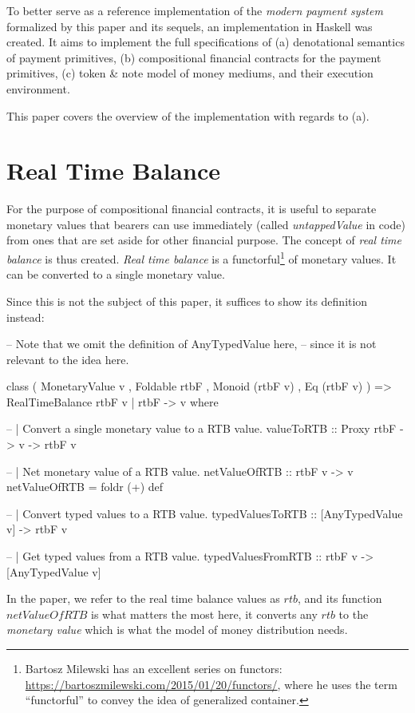 To better serve as a reference implementation of the \textit{modern payment system} formalized by
this paper and its sequels, an implementation in Haskell was created. It aims to implement the full
specifications of (a) denotational semantics of payment primitives, (b) compositional financial
contracts for the payment primitives, (c) token \& note model of money mediums, and their execution
environment.

This paper covers the overview of the implementation with regards to (a).

\section{Real Time Balance}

For the purpose of compositional financial contracts, it is useful to separate monetary values that
bearers can use immediately (called \textit{untappedValue} in code) from ones that are set aside for
other financial purpose. The concept of \textit{real time balance} is thus created. \textit{Real
time balance} is a functorful\footnote{Bartosz Milewski has an excellent series on
functors: \url{https://bartoszmilewski.com/2015/01/20/functors/}, where he uses the term
``functorful'' to convey the idea of generalized container.} of monetary values. It can be converted
to a single monetary value.

Since this is not the subject of this paper, it suffices to show its definition instead:

\begin{code}
-- Note that we omit the definition of AnyTypedValue here,
-- since it is not relevant to the idea here.

class ( MonetaryValue v
      , Foldable rtbF
      , Monoid (rtbF v)
      , Eq (rtbF v)
      ) => RealTimeBalance rtbF v | rtbF -> v where

    -- | Convert a single monetary value to a RTB value.
    valueToRTB :: Proxy rtbF -> v -> rtbF v

    -- | Net monetary value of a RTB value.
    netValueOfRTB :: rtbF v -> v
    netValueOfRTB = foldr (+) def

    -- | Convert typed values to a RTB value.
    typedValuesToRTB :: [AnyTypedValue v] -> rtbF v

    -- | Get typed values from a RTB value.
    typedValuesFromRTB :: rtbF v -> [AnyTypedValue v]
\end{code}

In the paper, we refer to the real time balance values as $rtb$, and its function $netValueOfRTB$ is
what matters the most here, it converts any $rtb$ to the \textit{monetary value} which is what the
model of money distribution needs.

